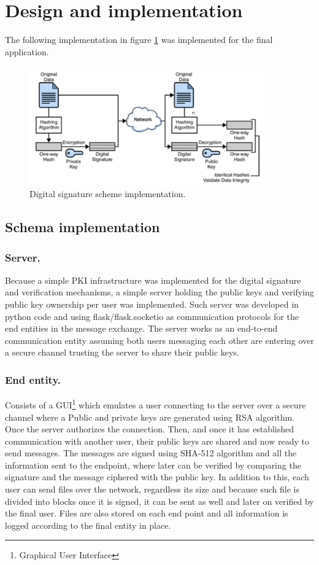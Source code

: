 \documentclass[letterpaper,12pt]{article}
\begin{document}
\section{Design and implementation}
The following implementation in figure \ref{fig:dss_scheme} was implemented for the final application.
\begin{figure}[H]
    \centering
    \includegraphics[width=0.9\textwidth]{assets/dss.png}
    \caption{Digital signature scheme implementation.}
    \label{fig:dss_scheme}
\end{figure}
\subsection{Schema implementation}
    \subsubsection{Server.}
    Because a simple PKI infrastructure was implemented for the digital signature and verification mechanisms, a simple server holding the public keys and verifying public key ownership per user was implemented. Such server was developed in python code and using flask/flask.socketio as communication protocols for the end entities in the message exchange. The server works as an end-to-end communication entity assuming both users messaging each other are entering over a secure channel trusting the server to share their public keys.

    \subsubsection{End entity.}
    Consists of a GUI\footnote{Graphical User Interface} which emulates a user connecting to the server over a secure channel where a Public and private keys are generated using RSA algorithm. Once the server authorizes the connection. Then, and once it has established communication with another user, their public keys are shared and now ready to send messages. The messages are signed using SHA-512 algorithm and all the information sent to the endpoint, where later can be verified by comparing the signature and the message ciphered with the public key. In addition to this, each user can send files over the network, regardless its size and because such file is divided into blocks once it is signed, it can be sent as well and later on verified by the final user. Files are also stored on each end point and all information is logged according to the final entity in place.
\end{document}
